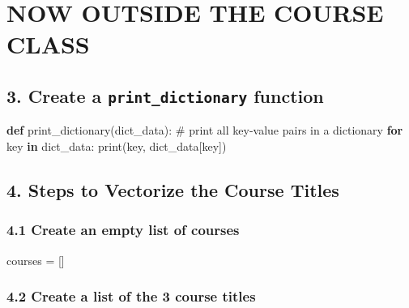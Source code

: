 \documentclass[
  letterpaper,
]{scrbook}
\newenvironment{Shaded}{\begin{snugshade}}{\end{snugshade}}
\newcommand{\BuiltInTok}[1]{\textcolor[rgb]{0.00,0.23,0.31}{#1}}
\newcommand{\CommentTok}[1]{\textcolor[rgb]{0.37,0.37,0.37}{#1}}
\newcommand{\ControlFlowTok}[1]{\textcolor[rgb]{0.00,0.23,0.31}{\textbf{#1}}}
\newcommand{\KeywordTok}[1]{\textcolor[rgb]{0.00,0.23,0.31}{\textbf{#1}}}
\newcommand{\NormalTok}[1]{\textcolor[rgb]{0.00,0.23,0.31}{#1}}
\newcommand{\OperatorTok}[1]{\textcolor[rgb]{0.37,0.37,0.37}{#1}}
\begin{document}
\section*{NOW OUTSIDE THE COURSE
CLASS}\label{now-outside-the-course-class}


\subsection*{\texorpdfstring{3. Create a \texttt{print\_dictionary}
function}{3. Create a print\_dictionary function}}\label{create-a-print_dictionary-function}

\begin{Shaded}
\begin{Highlighting}[]
\KeywordTok{def}\NormalTok{ print\_dictionary(dict\_data):}
    \CommentTok{\# print all key{-}value pairs in a dictionary}
    \ControlFlowTok{for}\NormalTok{ key }\KeywordTok{in}\NormalTok{ dict\_data: }
        \BuiltInTok{print}\NormalTok{(key, dict\_data[key])}
\end{Highlighting}
\end{Shaded}

\subsection*{4. Steps to Vectorize the Course
Titles}\label{steps-to-vectorize-the-course-titles}

\subsubsection*{4.1 Create an empty list of
courses}\label{create-an-empty-list-of-courses}

\begin{Shaded}
\begin{Highlighting}[]
\NormalTok{courses }\OperatorTok{=}\NormalTok{ []}
\end{Highlighting}
\end{Shaded}

\subsubsection*{4.2 Create a list of the 3 course
titles}\label{create-a-list-of-the-3-course-titles}
\end{document}
